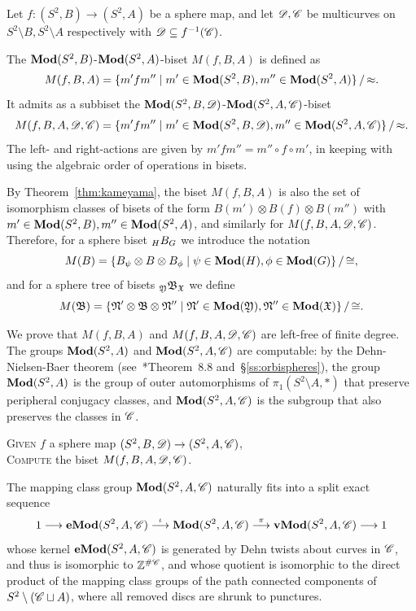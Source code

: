 \documentclass{amsart}
\begin{document}
Let $f\colon(S^2,B)\to(S^2,A)$ be a sphere map, and let $\DD,\CC$ be
multicurves on $S^2\setminus B,S^2\setminus A$ respectively with
$\DD\subseteq f^{-1}(\CC)$.
\begin{defn}
  The $\Mod(S^2,B)$-$\Mod(S^2,A)$-biset $M(f,B,A)$ is defined as
  \[M(f,B,A)=\{m'fm''\mid m'\in\Mod(S^2,B),m''\in\Mod(S^2,A)\}\,/\,{\approx}.\]
  It admits as a subbiset the  $\Mod(S^2,B,\DD)$-$\Mod(S^2,A,\CC)$-biset
  \[M(f,B,A,\DD,\CC)=\{m'fm''\mid
  m'\in\Mod(S^2,B,\DD),m''\in\Mod(S^2,A,\CC)\}\,/\,{\approx}.\]
  The left- and right-actions are given by
  $m'fm''=m''\circ f\circ m'$, in keeping with using the algebraic
  order of operations in bisets.
\end{defn}

By Theorem~\ref{thm:kameyama}, the biset $M(f,B,A)$ is also the set of
isomorphism classes of bisets of the form $B(m')\otimes B(f)\otimes
B(m'')$ with $m'\in\Mod(S^2,B),m''\in\Mod(S^2,A)$, and similarly for
$M(f,B,A,\DD,\CC)$. Therefore, for a sphere biset $\subscript H B_G$ we
introduce the notation
\begin{equation}
\label{eq:M(B)}
 M(B)=\{B_\psi\otimes B\otimes B_\phi\mid
\psi\in\Mod(H),\phi\in\Mod(G)\}\,/\,{\cong},
\end{equation}
and for a sphere tree of bisets $\subscript \gfY\gfB_\gf$ we
define
\begin{equation}\label{eq:conjgob}
  M(\gfB)=\{\mathfrak N' \otimes \gfB \otimes
  \mathfrak N''\mid \mathfrak N'\in\Mod(\gfY),\mathfrak
  N''\in\Mod(\gf)\}\,/\,{\cong}.
\end{equation}

We prove that $M(f,B,A)$ and $M(f,B,A,\DD,\CC)$ are left-free of
finite degree. The groups $\Mod(S^2,A)$ and $\Mod(S^2,A,\CC)$ are
computable: by the Dehn-Nielsen-Baer theorem
(see~\cite{farb-margalit:mcg}*{Theorem~8.8}
and~\S\ref{ss:orbispheres}), the group $\Mod(S^2,A)$ is the group of
outer automorphisms of $\pi_1(S^2\setminus A,*)$ that preserve
peripheral conjugacy classes, and $\Mod(S^2,A,\CC)$ is the subgroup that
also preserves the classes in $\CC$.
\begin{algo}\label{algo:mcb}
  \textsc{Given} $f$ a sphere map $(S^2,B,\DD)\to(S^2,A,\CC)$,\\
  \textsc{Compute} the biset $M(f,B,A,\DD,\CC)$.
\end{algo}

The mapping class group $\Mod(S^2,A,\CC)$ naturally fits into a split
exact sequence
\begin{equation}\label{eq:Mp_Gr_seq}
  1\longrightarrow\Mod[e](S^2,A,\CC)\overset \iota\longrightarrow
  \Mod(S^2,A,\CC)\overset\pi\longrightarrow\Mod[v](S^2,A,\CC)\longrightarrow1
\end{equation}
whose kernel $\Mod[e](S^2,A,\CC)$ is generated by Dehn twists about
curves in $\CC$, and thus is isomorphic to $\Z^{\#\CC}$, and whose
quotient is isomorphic to the direct product of the mapping class
groups of the path connected components of
$S^2\setminus(\CC\sqcup A)$, where all removed discs are shrunk to
punctures.
\end{document}
